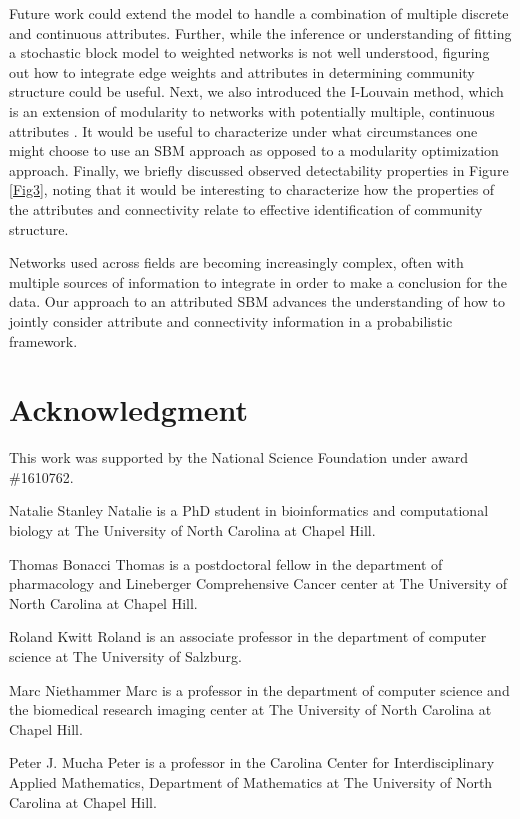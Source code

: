 \documentclass[10pt,journal,compsoc]{IEEEtran}
\begin{document}
Future work could extend the model to handle a combination of multiple discrete and continuous attributes. Further, while the inference or understanding of fitting a stochastic block model to weighted networks is not well understood, figuring out how to integrate edge weights and attributes in determining community structure could be useful. Next, we also introduced the I-Louvain method, which is an extension of modularity to networks with potentially multiple, continuous attributes \cite{ilouvain}. It would be useful to characterize under what circumstances one might choose to use an SBM approach as opposed to a modularity optimization approach. Finally, we briefly discussed observed detectability properties in Figure \ref{Fig3}, noting that it would be interesting to characterize how the properties of the attributes and connectivity relate to effective identification of community structure.

Networks used across fields are becoming increasingly complex, often with multiple sources of information to integrate in order to make a conclusion for the data. Our approach to an attributed SBM advances the understanding of how to jointly consider attribute and connectivity information in a probabilistic framework.  

\section*{Acknowledgment}
This work was supported by the National Science Foundation under award \#1610762.



\begin{IEEEbiography}{Natalie Stanley}
Natalie is a PhD student in bioinformatics and computational biology at The University of North Carolina at Chapel Hill. 
\end{IEEEbiography}
\begin{IEEEbiography}{Thomas Bonacci}
Thomas is a postdoctoral fellow in the department of pharmacology and Lineberger Comprehensive Cancer center at The University of North Carolina at Chapel Hill.  
\end{IEEEbiography}
\begin{IEEEbiography}{Roland Kwitt}
Roland is an associate professor in the department of computer science at The University of Salzburg. 
\end{IEEEbiography}
\begin{IEEEbiography}{Marc Niethammer}
Marc is a professor in the department of computer science and the biomedical research imaging center at The University of North Carolina at Chapel Hill. 
\end{IEEEbiography}
\begin{IEEEbiography}{Peter J. Mucha}
Peter is a professor in the Carolina Center for Interdisciplinary Applied Mathematics, Department of Mathematics at The University of North Carolina at Chapel Hill. 
\end{IEEEbiography}
\end{document}
